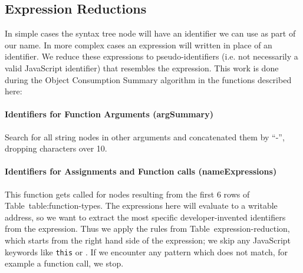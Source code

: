 \documentclass[10pt, preprint]{sigplanconf}
\begin{document}
{%




\subsection{Expression Reductions}
\label{sec:general-element-naming}

In simple cases the syntax tree node will have an identifier we can use as part of our name. In more complex cases an expression will written in place of an identifier. We reduce these expressions to pseudo-identifiers (i.e. not necessarily a valid JavaScript identifier) that resembles the expression. This work is done during the Object Consumption Summary algorithm in the functions described here:
\paragraph{Identifiers for Function Arguments (argSummary)} Search for all string nodes in other arguments and concatenated them by ``-'', dropping  characters over 10. 
\paragraph{Identifiers for Assignments and Function calls (nameExpressions)} This function gets called for nodes resulting from the first 6 rows of Table~{table:function-types}. The expressions here will evaluate to a writable address, so we want to extract the most specific developer-invented identifiers from the expression. Thus we apply the rules from Table~{expression-reduction}, which starts from the right hand side of the expression;  we skip any JavaScript keywords like \texttt{this} or . If we encounter any pattern which does not match, for example a function call, we stop. 

}
\end{document}
